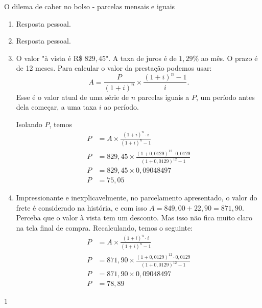 \marginpar{\vspace{.5em}}
\begin{answer}{O dilema de caber no bolso - parcelas mensais e iguais}
{
\begin{enumerate}
\item Resposta pessoal.
\item Resposta pessoal.
\item O valor "à vista é R\$ $829{,}45$". A taxa de juros é de $1{,}29\%$ ao mês. O prazo é de 12 meses. Para calcular o valor da prestação podemos usar:
\begin{equation*}
A=\frac{P}{(1+i)^n}\times\frac{(1+i)^n-1}{i}.
\end{equation*}
Esse é o valor atual de uma série de $n$ parcelas iguais a $P$, um período antes dela começar, a uma taxa $i$ ao período.

Isolando $P$, temos
\begin{align*}
P&=A\times\frac{(1+i)^n\cdot i}{(1+i)^n-1} \\
P&=829{,}45\times\frac{(1+0{,}0129)^{12}\cdot0{,}0129}{(1+0{,}0129)^{12}-1}\\
P&=829{,}45\times0{,}09048497\\
P&=75{,}05
\end{align*}

\item Impressionante e inexplicavelmente, no parcelamento apresentado, o valor do frete é considerado na história, e com isso $A=849{,}00+22{,}90=871{,}90$. Perceba que o valor à vista tem um desconto. Mas isso não fica muito claro na tela final de compra. Recalculando, temos o seguinte:
\begin{align*}
P&=A\times\frac{(1+i)^n\cdot i}{(1+i)^n-1} \\
P&=871{,}90\times\frac{(1+0{,}0129)^{12}\cdot0{,}0129}{(1+0{,}0129)^{12}-1}\\
P&=871{,}90\times0{,}09048497\\
P&=78{,}89
\end{align*}

\end{enumerate}
}{1}
\end{answer}
